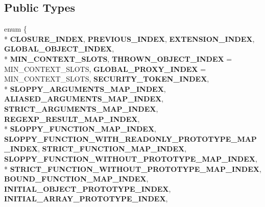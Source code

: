 \subsection*{Public Types}
\begin{DoxyCompactItemize}
\item 
\hypertarget{classv8_1_1internal_1_1_context_a30cccf11faad7c04f0675ea03e533ef6}{}enum \{ \\*
{\bfseries C\+L\+O\+S\+U\+R\+E\+\_\+\+I\+N\+D\+E\+X}, 
{\bfseries P\+R\+E\+V\+I\+O\+U\+S\+\_\+\+I\+N\+D\+E\+X}, 
{\bfseries E\+X\+T\+E\+N\+S\+I\+O\+N\+\_\+\+I\+N\+D\+E\+X}, 
{\bfseries G\+L\+O\+B\+A\+L\+\_\+\+O\+B\+J\+E\+C\+T\+\_\+\+I\+N\+D\+E\+X}, 
\\*
{\bfseries M\+I\+N\+\_\+\+C\+O\+N\+T\+E\+X\+T\+\_\+\+S\+L\+O\+T\+S}, 
{\bfseries T\+H\+R\+O\+W\+N\+\_\+\+O\+B\+J\+E\+C\+T\+\_\+\+I\+N\+D\+E\+X} = M\+I\+N\+\_\+\+C\+O\+N\+T\+E\+X\+T\+\_\+\+S\+L\+O\+T\+S, 
{\bfseries G\+L\+O\+B\+A\+L\+\_\+\+P\+R\+O\+X\+Y\+\_\+\+I\+N\+D\+E\+X} = M\+I\+N\+\_\+\+C\+O\+N\+T\+E\+X\+T\+\_\+\+S\+L\+O\+T\+S, 
{\bfseries S\+E\+C\+U\+R\+I\+T\+Y\+\_\+\+T\+O\+K\+E\+N\+\_\+\+I\+N\+D\+E\+X}, 
\\*
{\bfseries S\+L\+O\+P\+P\+Y\+\_\+\+A\+R\+G\+U\+M\+E\+N\+T\+S\+\_\+\+M\+A\+P\+\_\+\+I\+N\+D\+E\+X}, 
{\bfseries A\+L\+I\+A\+S\+E\+D\+\_\+\+A\+R\+G\+U\+M\+E\+N\+T\+S\+\_\+\+M\+A\+P\+\_\+\+I\+N\+D\+E\+X}, 
{\bfseries S\+T\+R\+I\+C\+T\+\_\+\+A\+R\+G\+U\+M\+E\+N\+T\+S\+\_\+\+M\+A\+P\+\_\+\+I\+N\+D\+E\+X}, 
{\bfseries R\+E\+G\+E\+X\+P\+\_\+\+R\+E\+S\+U\+L\+T\+\_\+\+M\+A\+P\+\_\+\+I\+N\+D\+E\+X}, 
\\*
{\bfseries S\+L\+O\+P\+P\+Y\+\_\+\+F\+U\+N\+C\+T\+I\+O\+N\+\_\+\+M\+A\+P\+\_\+\+I\+N\+D\+E\+X}, 
{\bfseries S\+L\+O\+P\+P\+Y\+\_\+\+F\+U\+N\+C\+T\+I\+O\+N\+\_\+\+W\+I\+T\+H\+\_\+\+R\+E\+A\+D\+O\+N\+L\+Y\+\_\+\+P\+R\+O\+T\+O\+T\+Y\+P\+E\+\_\+\+M\+A\+P\+\_\+\+I\+N\+D\+E\+X}, 
{\bfseries S\+T\+R\+I\+C\+T\+\_\+\+F\+U\+N\+C\+T\+I\+O\+N\+\_\+\+M\+A\+P\+\_\+\+I\+N\+D\+E\+X}, 
{\bfseries S\+L\+O\+P\+P\+Y\+\_\+\+F\+U\+N\+C\+T\+I\+O\+N\+\_\+\+W\+I\+T\+H\+O\+U\+T\+\_\+\+P\+R\+O\+T\+O\+T\+Y\+P\+E\+\_\+\+M\+A\+P\+\_\+\+I\+N\+D\+E\+X}, 
\\*
{\bfseries S\+T\+R\+I\+C\+T\+\_\+\+F\+U\+N\+C\+T\+I\+O\+N\+\_\+\+W\+I\+T\+H\+O\+U\+T\+\_\+\+P\+R\+O\+T\+O\+T\+Y\+P\+E\+\_\+\+M\+A\+P\+\_\+\+I\+N\+D\+E\+X}, 
{\bfseries B\+O\+U\+N\+D\+\_\+\+F\+U\+N\+C\+T\+I\+O\+N\+\_\+\+M\+A\+P\+\_\+\+I\+N\+D\+E\+X}, 
{\bfseries I\+N\+I\+T\+I\+A\+L\+\_\+\+O\+B\+J\+E\+C\+T\+\_\+\+P\+R\+O\+T\+O\+T\+Y\+P\+E\+\_\+\+I\+N\+D\+E\+X}, 
{\bfseries I\+N\+I\+T\+I\+A\+L\+\_\+\+A\+R\+R\+A\+Y\+\_\+\+P\+R\+O\+T\+O\+T\+Y\+P\+E\+\_\+\+I\+N\+D\+E\+X}, 

\end{DoxyCompactItemize}
